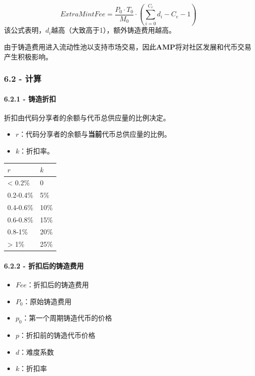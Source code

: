 \documentclass[
]{article}
\providecommand{\tightlist}{%
  \setlength{\itemsep}{0pt}\setlength{\parskip}{0pt}}
\begin{document}
\begin{equation}
ExtraMintFee = \frac{P_0 \cdot T_0}{M_0} \cdot (\sum_{i=0}^{C_e}d_i - C_e - 1)
\end{equation} 该公式表明，\(d_i\)越高（大致高于1），额外铸造费用越高。

由于铸造费用进入流动性池以支持市场交易，因此\textbf{AMP}将对社区发展和代币交易产生积极影响。

\subsubsection{6.2 - 计算}\label{ux8ba1ux7b97-1}

\paragraph{6.2.1 - 铸造折扣}\label{ux94f8ux9020ux6298ux6263}

折扣由代码分享者的余额与代币总供应量的比例决定。

\begin{itemize}
\tightlist
\item
  \(r\)：代码分享者的余额与\textbf{当前}代币总供应量的比例。
\item
  \(k\)：折扣率。
\end{itemize}

\begin{longtable}[]{@{}ll@{}}
\toprule\noalign{}
\(r\) & \(k\) \\
\midrule\noalign{}
\endhead
\bottomrule\noalign{}
\endlastfoot
\textless{} 0.2\% & 0 \\
0.2-0.4\% & 5\% \\
0.4-0.6\% & 10\% \\
0.6-0.8\% & 15\% \\
0.8-1\% & 20\% \\
\textgreater{} 1\% & 25\% \\
\end{longtable}

\paragraph{6.2.2 -
折扣后的铸造费用}\label{ux6298ux6263ux540eux7684ux94f8ux9020ux8d39ux7528}

\begin{itemize}
\tightlist
\item
  \(Fee\)：折扣后的铸造费用
\item
  \(P_0\)：原始铸造费用
\item
  \(p_0\)：第一个周期铸造代币的价格
\item
  \(p\)：折扣前的铸造代币价格
\item
  \(d\)：难度系数
\item
  \(k\)：折扣率
\end{itemize}
\end{document}
